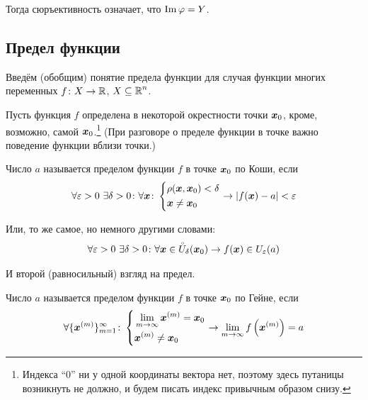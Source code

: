 \documentclass[a4paper,12pt]{article}
\renewcommand{\mathring}[1]{\accentset{\circ}{#1}}
\DeclareMathOperator{\Imag}{Im}
\begin{document}
  Тогда сюръективность означает, что $\Imag \phi \hm= Y$.

  
  \subsection{Предел функции}


  Введём (обобщим) понятие предела функции для случая функции многих переменных $f\colon X \hm\to \RR$, $X \hm\subseteq \RR^n$.

  Пусть функция $f$ определена в некоторой окрестности точки $\boldsymbol x_0$, кроме, возможно, самой $\boldsymbol x_0$.\footnote{
    Индекса ``0'' ни у одной координаты вектора нет, поэтому здесь путаницы возникнуть не должно, и будем писать индекс привычным образом снизу.
  }
  (При разговоре о пределе функции в точке важно поведение функции вблизи точки.)

  Число $a$ называется пределом функции $f$ в точке $\boldsymbol x_0$ по Коши, если
  \begin{equation}\label{eq:func-limit-cochi}
  \begin{split}
    \forall \varepsilon > 0\ \exists \delta > 0\colon \forall \boldsymbol x\colon \left\{
      \begin{aligned}
        &\rho(\boldsymbol x, \boldsymbol x_0) < \delta\\
        &\boldsymbol x \not= \boldsymbol x_0
      \end{aligned}
    \right. \to |f(\boldsymbol x) - a| < \varepsilon
  \end{split}
  \end{equation}

  Или, то же самое, но немного другими словами:
  \begin{equation}
  \begin{split}
    \forall \eps > 0\ \exists \delta > 0\colon \forall \bds x \in \mathring U_{\delta}(\bds x_0) \to f(\bds x) \in U_{\eps}(a)
  \end{split}
  \end{equation}

  И второй (равносильный) взгляд на предел.

  Число $a$ называется пределом функции $f$ в точке $\boldsymbol x_0$ по Гейне, если
  \begin{equation}
  \begin{split}
    \forall \{\boldsymbol x^{(m)}\}_{m = 1}^{\infty}\colon \left\{
      \begin{aligned}
        &\lim_{m \to \infty} \boldsymbol x^{(m)} = \boldsymbol x_0\\
        &\boldsymbol x^{(m)} \not= \boldsymbol x_0
      \end{aligned}
    \right. \to \lim_{m \to \infty} f\left(\boldsymbol x^{(m)}\right) = a
  \end{split}
  \end{equation}
  
\end{document}
